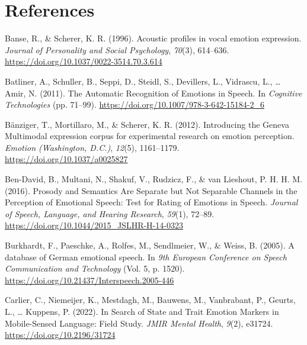 \documentclass[
  english,
  man,floatsintext]{apa6}
\newlength{\cslhangindent}
\newenvironment{CSLReferences}[2] %
 {%
  \setlength{\parindent}{0pt}
  \ifodd #1 \everypar{\setlength{\hangindent}{\cslhangindent}}\ignorespaces\fi
  \ifnum #2 > 0
  \setlength{\parskip}{#2\baselineskip}
  \fi
 }%
 {}
\begin{document}
\newpage

\hypertarget{references}{%
\section{References}\label{references}}

\hypertarget{refs}{}
\begin{CSLReferences}{1}{0}
\leavevmode{}%
Banse, R., \& Scherer, K. R. (1996). Acoustic profiles in vocal emotion expression. \emph{Journal of Personality and Social Psychology}, \emph{70}(3), 614--636. \url{https://doi.org/10.1037/0022-3514.70.3.614}

\leavevmode{}%
Batliner, A., Schuller, B., Seppi, D., Steidl, S., Devillers, L., Vidrascu, L., \ldots{} Amir, N. (2011). The {Automatic Recognition} of {Emotions} in {Speech}. In \emph{Cognitive {Technologies}} (pp. 71--99). \url{https://doi.org/10.1007/978-3-642-15184-2_6}

\leavevmode{}%
Bänziger, T., Mortillaro, M., \& Scherer, K. R. (2012). Introducing the {Geneva Multimodal} expression corpus for experimental research on emotion perception. \emph{Emotion (Washington, D.C.)}, \emph{12}(5), 1161--1179. \url{https://doi.org/10.1037/a0025827}

\leavevmode{}%
Ben-David, B., Multani, N., Shakuf, V., Rudzicz, F., \& van Lieshout, P. H. H. M. (2016). Prosody and {Semantics Are Separate} but {Not Separable Channels} in the {Perception} of {Emotional Speech}: {Test} for {Rating} of {Emotions} in {Speech}. \emph{Journal of Speech, Language, and Hearing Research}, \emph{59}(1), 72--89. \url{https://doi.org/10.1044/2015_JSLHR-H-14-0323}

\leavevmode{}%
Burkhardt, F., Paeschke, A., Rolfes, M., Sendlmeier, W., \& Weiss, B. (2005). A database of {German} emotional speech. In \emph{9th European Conference on Speech Communication and Technology} (Vol. 5, p. 1520). \url{https://doi.org/10.21437/Interspeech.2005-446}

\leavevmode{}%
Carlier, C., Niemeijer, K., Mestdagh, M., Bauwens, M., Vanbrabant, P., Geurts, L., \ldots{} Kuppens, P. (2022). In {Search} of {State} and {Trait Emotion Markers} in {Mobile-Sensed Language}: {Field Study}. \emph{JMIR Mental Health}, \emph{9}(2), e31724. \url{https://doi.org/10.2196/31724}


\end{CSLReferences}
\end{document}
